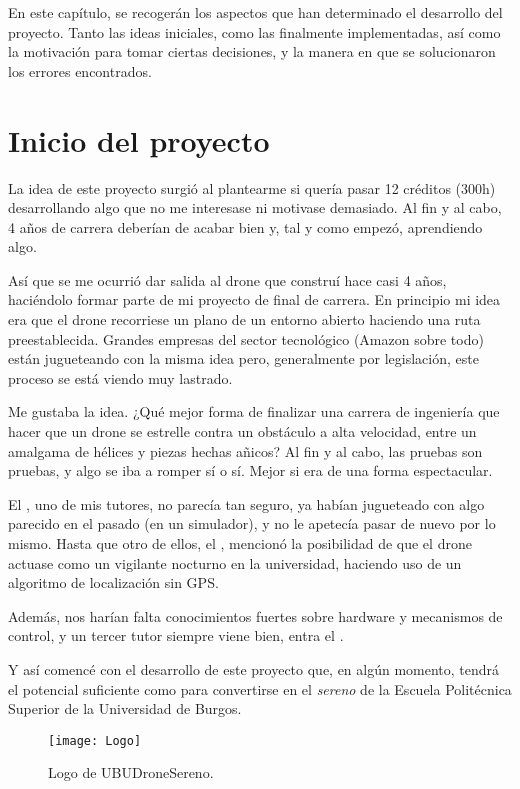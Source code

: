 \label{cap:RelvAsp}
En este capítulo, se recogerán los aspectos que han determinado el desarrollo del proyecto. Tanto las ideas iniciales, como las finalmente implementadas, así como la motivación para tomar ciertas decisiones, y la manera en que se solucionaron los errores encontrados. 

\section{Inicio del proyecto}

La idea de este proyecto surgió al plantearme si quería pasar 12 créditos (300h) desarrollando algo que no me interesase ni motivase demasiado. Al fin y al cabo, 4 años de carrera deberían de acabar bien y, tal y como empezó, aprendiendo algo.

Así que se me ocurrió dar salida al drone que construí hace casi 4 años, haciéndolo formar parte de mi proyecto de final de carrera. En principio mi idea era que el drone recorriese un plano de un entorno abierto haciendo una ruta preestablecida. Grandes empresas del sector tecnológico (Amazon sobre todo) están jugueteando con la misma idea pero, generalmente por legislación, este proceso se está viendo muy lastrado. 

Me gustaba la idea. ¿Qué mejor forma de finalizar una carrera de ingeniería que hacer que un drone se estrelle contra un obstáculo a alta velocidad, entre un amalgama de hélices y piezas hechas añicos? Al fin y al cabo, las pruebas son pruebas, y algo se iba  a romper sí o sí. Mejor si era de una forma espectacular.

El \cotutorOne{}, uno de mis tutores, no parecía tan seguro, ya habían jugueteado con algo parecido en el pasado (en un simulador), y no le apetecía pasar de nuevo por lo mismo. Hasta que otro de ellos, el \cotutorTwo{}, mencionó la posibilidad de que el drone actuase como un vigilante nocturno en la universidad, haciendo uso de un algoritmo de localización sin GPS. 

Además, nos harían falta conocimientos fuertes sobre hardware y mecanismos de control, y un tercer tutor siempre viene bien, entra el \tutor{}.

Y así comencé con el desarrollo de este proyecto que, en algún momento, tendrá el potencial suficiente como para convertirse en el \emph{sereno} de la Escuela Politécnica Superior de la Universidad de Burgos.

\begin{figure}[H]
	\centering
	\texttt{[image: Logo]}
	\caption[Logo]{Logo de UBUDroneSereno.}\label{fig:Logo}
\end{figure}




